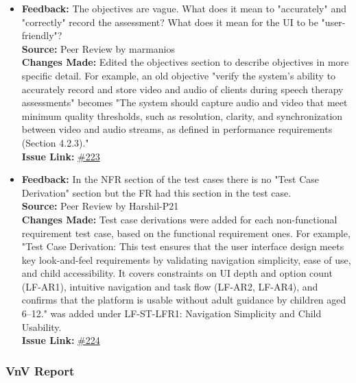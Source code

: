 \documentclass{article}
\begin{document}
\begin{itemize}
    \item 
      \textbf{Feedback:} The objectives are vague. What does it mean to "accurately" and "correctly" record the assessment? What does it mean for the UI to be "user-friendly"? \\
      \textbf{Source:} Peer Review by marmanios \\
      \textbf{Changes Made:} Edited the objectives section to describe objectives in more specific detail. For example, an old objective "verify the system's ability to accurately record and store video and audio of clients during speech therapy assessments" becomes "The system should capture audio and video that meet minimum quality thresholds, such as resolution, clarity, and synchronization between video and audio streams, as defined in performance requirements (Section 4.2.3)."\\
      \textbf{Issue Link:} \href{https://github.com/parishanizam/TeleHealth/issues/223}{\#223}

    \item 
      \textbf{Feedback:} In the NFR section of the test cases there is no "Test Case Derivation" section but the FR had this section in the test case. \\
      \textbf{Source:} Peer Review by Harshil-P21 \\
      \textbf{Changes Made:} Test case derivations were added for each non-functional requirement test case, based on the functional requirement ones. For example, "Test Case Derivation: This test ensures that the user interface design meets key look-and-feel requirements by validating navigation simplicity, ease of use, and child accessibility. It covers constraints on UI depth and option count (LF-AR1), intuitive navigation and task flow (LF-AR2, LF-AR4), and confirms that the platform is usable without adult guidance by children aged 6–12." was added under LF-ST-LFR1: Navigation Simplicity and Child Usability.\\
      \textbf{Issue Link:} \href{https://github.com/parishanizam/TeleHealth/issues/224}{\#224}

\end{itemize}

\subsubsection{VnV Report}
\end{document}
